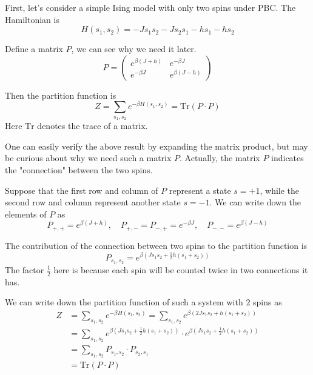 \documentclass[11pt]{article}
\begin{document}
	First, let's consider a simple Ising model with only two spins under PBC.
	The Hamiltonian is
	\begin{equation} \label{eq:Hamiltonian1DGeneral2Spins}
		H(s_1, s_2) = -J s_1 s_2 - J s_2 s_1 - hs_1 - hs_2
	\end{equation}

	Define a matrix $P$, we can see why we need it later.
	\begin{equation} \label{eq:MatrixP}
		P = \begin{pmatrix}
			e^{\beta(J+h)} & e^{-\beta J} \\
			e^{-\beta J} & e^{\beta(J-h)}
		\end{pmatrix}
	\end{equation}

	Then the partition function is
	\begin{equation} \label{eq:PartitionFunction1DGeneral2Spins}
		Z = \sum_{s_1, s_2} e^{-\beta H(s_1, s_2)} = \mathrm{Tr}(P \cdot P)
	\end{equation}
	Here $\mathrm{Tr}$ denotes the trace of a matrix.

	One can easily verify the above result by expanding the matrix product, 
	but may be curious about why we need such a matrix $P$.
	Actually, the matrix $P$ indicates the "connection" between the two spins.

	Suppose that the first row and column of $P$ represent a state $s = +1$, 
	while the second row and column represent another state $s = -1$.
	We can write down the elements of $P$ as
	\begin{equation} \label{eq:MatrixPElements}
		P_{+,+} = e^{\beta(J+h)}, \quad P_{+,-} = P_{-,+} = e^{-\beta J}, \quad P_{-,-} = e^{\beta(J-h)}
	\end{equation}

	The contribution of the connection between two spins to the partition function is
	\begin{equation} \label{eq:PartitionFunction1DGeneral2SpinsConnection}
		P_{s_1, s_2} = e^{\beta(J s_1 s_2 + \frac12h(s_1 + s_2))}
	\end{equation}
	The factor $\frac12$ here is because each spin will be counted twice in two connections it has.

	We can write down the partition function of such a system with $2$ spins as
	\begin{equation} \label{eq:PartitionFunction1DGeneral2SpinsConnectionSum}
		\begin{aligned}
		Z &= \sum_{s_1, s_2} e^{-\beta H(s_1, s_2)} = \sum_{s_1, s_2} e^{\beta(2J s_1 s_2 + h(s_1 + s_2))} \\
		&= \sum_{s_1, s_2} e^{\beta(J s_1 s_2 + \frac12h(s_1 + s_2))} \cdot e^{\beta(J s_1 s_2 + \frac12h(s_1 + s_2))} \\
		&= \sum_{s_1, s_2} P_{s_1, s_2} \cdot P_{s_2, s_1} \\
		&= \mathrm{Tr}(P \cdot P)
		\end{aligned}
	\end{equation}
\end{document}
